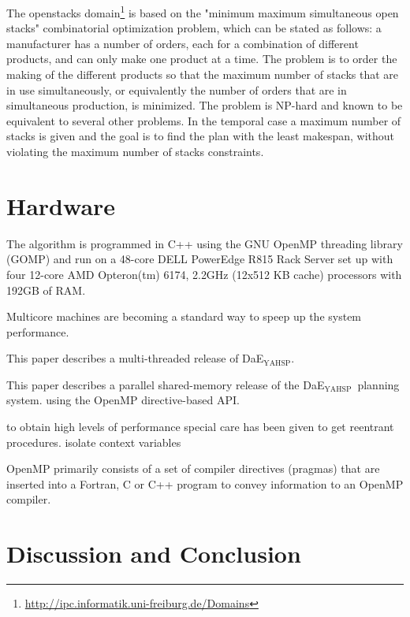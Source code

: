 \documentclass{sig-alternate}
\newcommand{\DAEYAHSP}{{\sc DaE$_{\text{YAHSP}}$}}
\begin{document}
The openstacks domain\footnote{\url{http://ipc.informatik.uni-freiburg.de/Domains}} is based on the "minimum maximum simultaneous open stacks" combinatorial optimization problem, which can be stated as follows: a manufacturer has a number of orders, each for a combination of different products, and can only make one product at a time. The problem is to order the making of the different products so that the maximum number of stacks that are in use simultaneously, or equivalently the number of orders that are in simultaneous production, is minimized. The problem is NP-hard and known to be equivalent to several other problems. In the temporal case a maximum number of stacks is given and the goal is to find the plan with the least makespan, without violating the maximum number of stacks constraints.


\section{Hardware}
The algorithm is programmed in C++ using the GNU OpenMP threading library (GOMP) and run on a 48-core DELL PowerEdge R815 Rack Server set up with four 12-core AMD Opteron(tm) 6174, 2.2GHz (12x512 KB cache) processors with 192GB of RAM.

Multicore machines are becoming a standard way to speep up the system performance.

This paper describes a multi-threaded release of \DAEYAHSP.

This paper describes a parallel shared-memory release of the \DAEYAHSP\ planning system.
using the OpenMP directive-based API.

to obtain high levels of performance special care has been given to get reentrant procedures.
isolate context variables 


OpenMP primarily consists of a set of compiler directives (pragmas) that are inserted into a Fortran, C or C++ program to convey information to an OpenMP compiler.


\cite{paradiseo:JHeuristics2004}
\cite{paradiseo:ParallelComputing2004}
\cite{alba:IEEE2002}
\cite{alba:COR2008}
\cite{alba:IPL2002}
\cite{burns:JAIR2010}
\cite{burns:icaps2009}
\cite{burns:ijcai2009}
\cite{vidal:socs2010}
\cite{dae:icaps2010}
\cite{dae:evocop2006}
\cite{dae:gecco2010}
\cite{yahsp:icaps2004}

\section{Discussion and Conclusion}
\end{document}
